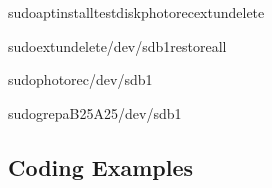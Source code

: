 \documentclass[letterpaper,10pt,english]{sphinxmanual}
\begin{document}
\begin{sphinxVerbatim}[commandchars=\\\{\}]
sudoaptinstalltestdiskphotorecextundelete

sudoextundelete/dev/sdb1\PYGZhy{}\PYGZhy{}restore\PYGZhy{}all

sudophotorec/dev/sdb1

sudogrep\PYGZhy{}a\PYGZhy{}B25\PYGZhy{}A25/dev/sdb1
\end{sphinxVerbatim}


\subsection{Coding Examples}
\label{\detokenize{file-systems:coding-examples}}
\end{document}
